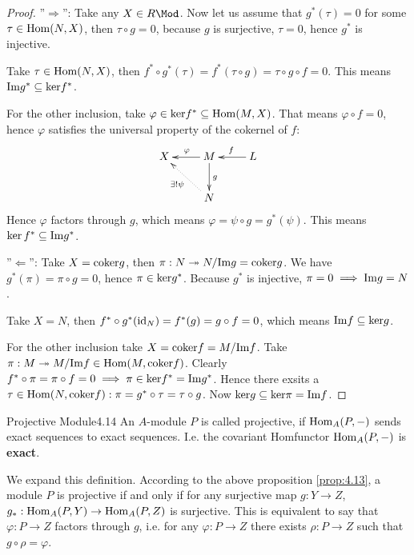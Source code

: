\documentclass[twoside = false,	%
		headsepline,		%
		parskip = true,
		]{scrbook}						%
\begin{document}
        \begin{proof}
        ''$\Rightarrow$'': Take any $X \in R\Mod$. Now let us assume that $g^*(\tau) = 0$ for some $\tau \in \mathrm{Hom}(N,X)$,
        then $\tau \circ g = 0$, because $g$ is surjective, $\tau = 0$, hence $g^*$ is injective.

        Take $\tau \in \mathrm{Hom}(N,X)$, then $f^* \circ g^* (\tau) = f^*(\tau \circ g) = \tau \circ g \circ f = 0$.
        This means $\mathrm{Im} g^* \subseteq \mathrm{ker} f^*$.

        For the other inclusion, take $\varphi \in \mathrm{ker} f^* \subseteq \mathrm{Hom}(M,X)$. That means $\varphi \circ f = 0$,
        hence $\varphi$ satisfies the universal property of the cokernel of $f$:
        \begin{equation*}
        \xymatrix {
            X & M \ar[l]_{\varphi} \ar[d]^{g} & \ar[l]_{f} L \\
            & N \ar@{.>}[ul]^{\exists ! \psi} & 
        }
        \end{equation*}
        Hence $\varphi$ factors through $g$, which means $\varphi = \psi \circ g = g^*(\psi)$.
        This means $\ker f^* \subseteq \mathrm{Im} g^* $.

        ''$\Leftarrow$'': Take $X = \mathrm{coker} g$, then $\pi: N \twoheadrightarrow N/\mathrm{Im} g = \mathrm{coker} g$.
        We have $g^*(\pi) = \pi \circ g = 0$, hence $\pi \in \mathrm{ker} g^* $.
        Because $g^*$ is injective, $\pi = 0 \implies \mathrm{Im} g = N$.

        Take $X = N$, then $f^* \circ g^* (\mathrm{id}_N) = f^* (g) = g \circ f = 0$,
        which means $\mathrm{Im} f \subseteq \mathrm{ker} g$.

        For the other inclusion take $X = \mathrm{coker} f = M/\mathrm{Im} f$. Take $\pi: M \twoheadrightarrow M/\mathrm{Im} f \in \mathrm{Hom}(M,\mathrm{coker} f)$.
        Clearly $f^* \circ \pi = \pi \circ f = 0 \implies \pi \in \mathrm{ker} f^* = \mathrm{Im} g^*$. Hence there exsits a $\tau \in \mathrm{Hom}(N,\mathrm{coker} f): \pi = g^* \circ \tau = \tau \circ g$.
        Now $\mathrm{ker} g \subseteq \mathrm{ker} \pi  = \mathrm{Im} f $. 
    \end{proof}

    \begin{definition}{Projective Module}{4.14}
        An $A$-module $P$ is called projective, if $\mathrm{Hom}_A(P,-)$ sends exact sequences to exact sequences. I.e. the covariant Homfunctor $\mathrm{Hom}_A(P,-)$ is \textbf{exact}.
    \end{definition}

    We expand this definition. According to the above proposition \ref{prop:4.13}, a module $P$ is projective if and only if for any surjective map $g: Y \to Z$, $g_*: \mathrm{Hom}_A(P,Y) \to \mathrm{Hom}_A(P,Z)$ is surjective. This is equivalent to say that $\varphi: P \to Z$ factors through $g$, i.e. for any $\varphi: P \to Z$ there exists $\rho:P \to Z$ such that $g \circ \rho = \varphi$.
\end{document}
